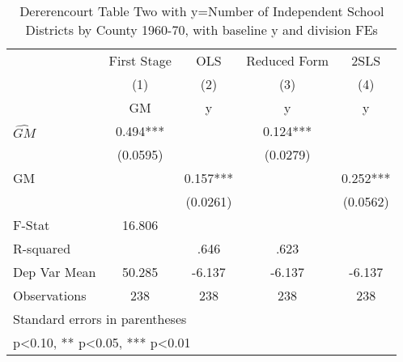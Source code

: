 \begin{table}[htbp]\centering
\def\sym#1{\ifmmode^{#1}\else\(^{#1}\)\fi}
\caption{Dererencourt Table Two with y=Number of Independent School Districts by County 1960-70, with baseline y and division FEs}
\begin{tabular}{l*{4}{c}}
\toprule
                    & First Stage   &         OLS   &Reduced Form   &        2SLS   \\
                    &\multicolumn{1}{c}{(1)}&\multicolumn{1}{c}{(2)}&\multicolumn{1}{c}{(3)}&\multicolumn{1}{c}{(4)}\\
                    &\multicolumn{1}{c}{GM}&\multicolumn{1}{c}{y}&\multicolumn{1}{c}{y}&\multicolumn{1}{c}{y}\\
\midrule
$\hat{GM}$          &       0.494***&               &       0.124***&               \\
                    &    (0.0595)   &               &    (0.0279)   &               \\
\addlinespace
GM                  &               &       0.157***&               &       0.252***\\
                    &               &    (0.0261)   &               &    (0.0562)   \\
\midrule
F-Stat              &      16.806   &               &               &               \\
R-squared           &               &        .646   &        .623   &               \\
Dep Var Mean        &      50.285   &      -6.137   &      -6.137   &      -6.137   \\
Observations        &         238   &         238   &         238   &         238   \\
\bottomrule
\multicolumn{5}{l}{\footnotesize Standard errors in parentheses}\\
\multicolumn{5}{l}{\footnotesize * p<0.10, ** p<0.05, *** p<0.01}\\
\end{tabular}
\end{table}
